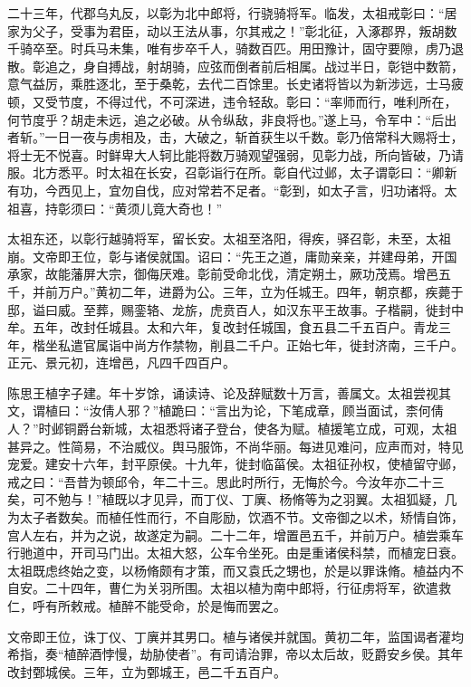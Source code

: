 \documentclass[12pt,UTF8]{ctexbook}
\begin{document}
二十三年，代郡乌丸反，以彰为北中郎将，行骁骑将军。临发，太祖戒彰曰：“居家为父子，受事为君臣，动以王法从事，尔其戒之！”彰北征，入涿郡界，叛胡数千骑卒至。时兵马未集，唯有步卒千人，骑数百匹。用田豫计，固守要隙，虏乃退散。彰追之，身自搏战，射胡骑，应弦而倒者前后相属。战过半日，彰铠中数箭，意气益厉，乘胜逐北，至于桑乾，去代二百馀里。长史诸将皆以为新涉远，士马疲顿，又受节度，不得过代，不可深进，违令轻敌。彰曰：“率师而行，唯利所在，何节度乎？胡走未远，追之必破。从令纵敌，非良将也。”遂上马，令军中：“后出者斩。”一日一夜与虏相及，击，大破之，斩首获生以千数。彰乃倍常科大赐将士，将士无不悦喜。时鲜卑大人轲比能将数万骑观望强弱，见彰力战，所向皆破，乃请服。北方悉平。时太祖在长安，召彰诣行在所。彰自代过邺，太子谓彰曰：“卿新有功，今西见上，宜勿自伐，应对常若不足者。“彰到，如太子言，归功诸将。太祖喜，持彰须曰：“黄须儿竟大奇也！”

太祖东还，以彰行越骑将军，留长安。太祖至洛阳，得疾，驿召彰，未至，太祖崩。文帝即王位，彰与诸侯就国。诏曰：“先王之道，庸勋亲亲，并建母弟，开国承家，故能藩屏大宗，御侮厌难。彰前受命北伐，清定朔土，厥功茂焉。增邑五千，并前万户。”黄初二年，进爵为公。三年，立为任城王。四年，朝京都，疾薨于邸，谥曰威。至葬，赐銮辂、龙旂，虎贲百人，如汉东平王故事。子楷嗣，徙封中牟。五年，改封任城县。太和六年，复改封任城国，食五县二千五百户。青龙三年，楷坐私遣官属诣中尚方作禁物，削县二千户。正始七年，徙封济南，三千户。正元、景元初，连增邑，凡四千四百户。

陈思王植字子建。年十岁馀，诵读诗、论及辞赋数十万言，善属文。太祖尝视其文，谓植曰：“汝倩人邪？”植跪曰：“言出为论，下笔成章，顾当面试，柰何倩人？”时邺铜爵台新城，太祖悉将诸子登台，使各为赋。植援笔立成，可观，太祖甚异之。性简易，不治威仪。舆马服饰，不尚华丽。每进见难问，应声而对，特见宠爱。建安十六年，封平原侯。十九年，徙封临菑侯。太祖征孙权，使植留守邺，戒之曰：“吾昔为顿邱令，年二十三。思此时所行，无悔於今。今汝年亦二十三矣，可不勉与！”植既以才见异，而丁仪、丁廙、杨脩等为之羽翼。太祖狐疑，几为太子者数矣。而植任性而行，不自彫励，饮酒不节。文帝御之以术，矫情自饰，宫人左右，并为之说，故遂定为嗣。二十二年，增置邑五千，并前万户。植尝乘车行驰道中，开司马门出。太祖大怒，公车令坐死。由是重诸侯科禁，而植宠日衰。太祖既虑终始之变，以杨脩颇有才策，而又袁氏之甥也，於是以罪诛脩。植益内不自安。二十四年，曹仁为关羽所围。太祖以植为南中郎将，行征虏将军，欲遣救仁，呼有所敕戒。植醉不能受命，於是悔而罢之。

文帝即王位，诛丁仪、丁廙并其男口。植与诸侯并就国。黄初二年，监国谒者灌均希指，奏“植醉酒悖慢，劫胁使者”。有司请治罪，帝以太后故，贬爵安乡侯。其年改封鄄城侯。三年，立为鄄城王，邑二千五百户。
\end{document}
